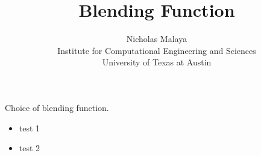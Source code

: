 \documentclass{article}
\title{\bf{Blending Function}}
\author{Nicholas Malaya \\ Institute for Computational Engineering and Sciences \\ University of Texas at Austin} \date{}
\begin{document}
\maketitle

Choice of blending function. 

\begin{itemize}
	\item test 1
\item test 2 
\end{itemize}
\end{document}
